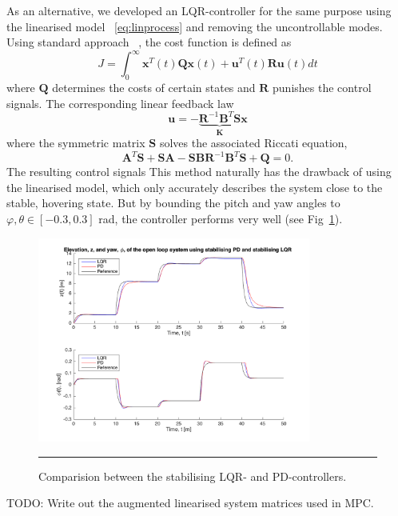 \documentclass{article}
\begin{document}
As an alternative, we developed an LQR-controller for the same purpose using the linearised model ~\eqref{eq:linprocess} and removing the uncontrollable modes. Using standard approach ~\cite{glad2000control}, the cost function is defined as
\begin{equation}
J = \int_0^{\infty} \mathbf{x}^T(t)\mathbf{Q}\mathbf{x}(t) + \mathbf{u}^T(t)\mathbf{R}\mathbf{u}(t)dt
\end{equation}
where $\mathbf{Q}$ determines the costs of certain states and $\mathbf{R}$ punishes the control signals. The corresponding linear feedback law
\begin{equation}
\mathbf{u}= -\underbrace{\mathbf{R}^{-1}\mathbf{B}^T\mathbf{S} }_{\mathbf{K}}\mathbf{x}
\end{equation}
where the symmetric matrix $\mathbf{S}$ solves the associated Riccati equation,
\begin{equation}
\mathbf{A}^T\mathbf{S}+\mathbf{S}\mathbf{A}-\mathbf{S}\mathbf{B}\mathbf{R}^{-1}\mathbf{B}^T\mathbf{S}+\mathbf{Q}=0.
\end{equation}
The resulting control signals 
This method naturally has the drawback of using the linearised model, which only accurately describes the system close to the stable, hovering state. But by bounding the pitch and yaw angles to $\varphi,\theta \in [-0.3,0.3]$ rad, the controller performs very well (see Fig~\ref{fig:LQR-PD-comp}).

\begin{figure}[htbp]
\centering
\includegraphics[width=0.8\textwidth]{figures/LQR-PD-comp.png}
\rule{35em}{0.5pt}
\caption{Comparision between the stabilising LQR- and PD-controllers.}
\label{fig:LQR-PD-comp}
\end{figure}

TODO: Write out the augmented linearised system matrices used in MPC.
\end{document}
